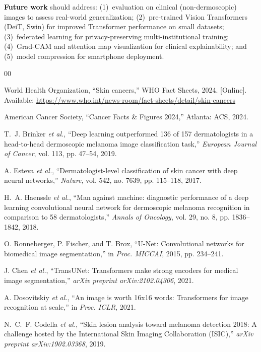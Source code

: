 \documentclass[10pt,twocolumn]{article}
\begin{document}
\textbf{Future work} should address: (1)~evaluation on clinical (non-dermoscopic) images to assess real-world generalization; (2)~pre-trained Vision Transformers (DeiT, Swin) for improved Transformer performance on small datasets; (3)~federated learning for privacy-preserving multi-institutional training; (4)~Grad-CAM and attention map visualization for clinical explainability; and (5)~model compression for smartphone deployment.

\clearpage
\begin{thebibliography}{00}

World Health Organization, ``Skin cancers,'' WHO Fact Sheets, 2024. [Online]. Available: \url{https://www.who.int/news-room/fact-sheets/detail/skin-cancers}

American Cancer Society, ``Cancer Facts \& Figures 2024,'' Atlanta: ACS, 2024.

T.~J. Brinker \textit{et al.}, ``Deep learning outperformed 136 of 157 dermatologists in a head-to-head dermoscopic melanoma image classification task,'' \textit{European Journal of Cancer}, vol. 113, pp. 47--54, 2019.

A. Esteva \textit{et al.}, ``Dermatologist-level classification of skin cancer with deep neural networks,'' \textit{Nature}, vol. 542, no. 7639, pp. 115--118, 2017.

H.~A. Haenssle \textit{et al.}, ``Man against machine: diagnostic performance of a deep learning convolutional neural network for dermoscopic melanoma recognition in comparison to 58 dermatologists,'' \textit{Annals of Oncology}, vol. 29, no. 8, pp. 1836--1842, 2018.

O. Ronneberger, P. Fischer, and T. Brox, ``U-Net: Convolutional networks for biomedical image segmentation,'' in \textit{Proc. MICCAI}, 2015, pp. 234--241.

J. Chen \textit{et al.}, ``TransUNet: Transformers make strong encoders for medical image segmentation,'' \textit{arXiv preprint arXiv:2102.04306}, 2021.

A. Dosovitskiy \textit{et al.}, ``An image is worth 16x16 words: Transformers for image recognition at scale,'' in \textit{Proc. ICLR}, 2021.

N.~C.~F. Codella \textit{et al.}, ``Skin lesion analysis toward melanoma detection 2018: A challenge hosted by the International Skin Imaging Collaboration (ISIC),'' \textit{arXiv preprint arXiv:1902.03368}, 2019.


\end{thebibliography}
\end{document}
